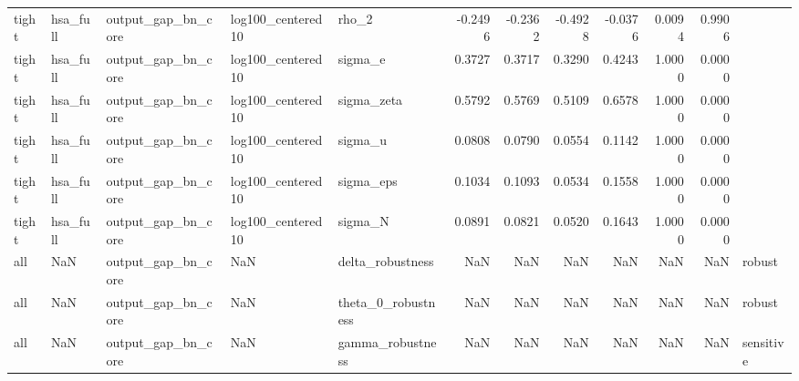 \begin{tabular}{lllllrrrrrrl}
tight & hsa\_full & output\_gap\_bn\_core & log100\_centered10 & rho\_2 & -0.2496 & -0.2362 & -0.4928 & -0.0376 & 0.0094 & 0.9906 &  \\
tight & hsa\_full & output\_gap\_bn\_core & log100\_centered10 & sigma\_e & 0.3727 & 0.3717 & 0.3290 & 0.4243 & 1.0000 & 0.0000 &  \\
tight & hsa\_full & output\_gap\_bn\_core & log100\_centered10 & sigma\_zeta & 0.5792 & 0.5769 & 0.5109 & 0.6578 & 1.0000 & 0.0000 &  \\
tight & hsa\_full & output\_gap\_bn\_core & log100\_centered10 & sigma\_u & 0.0808 & 0.0790 & 0.0554 & 0.1142 & 1.0000 & 0.0000 &  \\
tight & hsa\_full & output\_gap\_bn\_core & log100\_centered10 & sigma\_eps & 0.1034 & 0.1093 & 0.0534 & 0.1558 & 1.0000 & 0.0000 &  \\
tight & hsa\_full & output\_gap\_bn\_core & log100\_centered10 & sigma\_N & 0.0891 & 0.0821 & 0.0520 & 0.1643 & 1.0000 & 0.0000 &  \\
all & NaN & output\_gap\_bn\_core & NaN & delta\_robustness & NaN & NaN & NaN & NaN & NaN & NaN & robust \\
all & NaN & output\_gap\_bn\_core & NaN & theta\_0\_robustness & NaN & NaN & NaN & NaN & NaN & NaN & robust \\
all & NaN & output\_gap\_bn\_core & NaN & gamma\_robustness & NaN & NaN & NaN & NaN & NaN & NaN & sensitive \\
\bottomrule
\end{tabular}
